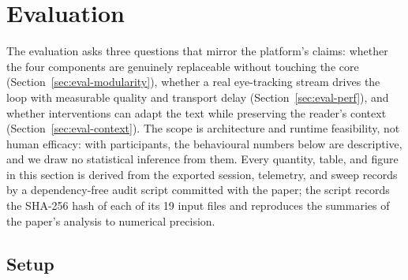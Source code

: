 \section{Evaluation}
\label{sec:eval}

The evaluation asks three questions that mirror the platform's claims: whether the four components are genuinely replaceable without touching the core (Section~\ref{sec:eval-modularity}), whether a real eye-tracking stream drives the loop with measurable quality and transport delay (Section~\ref{sec:eval-perf}), and whether interventions can adapt the text while preserving the reader's context (Section~\ref{sec:eval-context}).
The scope is architecture and runtime feasibility, not human efficacy: with \participantsN{} participants, the behavioural numbers below are descriptive, and we draw no statistical inference from them.
Every quantity, table, and figure in this section is derived from the exported session, telemetry, and sweep records by a dependency-free audit script committed with the paper; the script records the SHA-256 hash of each of its 19 input files and reproduces the summaries of the paper's analysis to numerical precision.

\subsection{Setup}
\label{sec:eval-setup}

